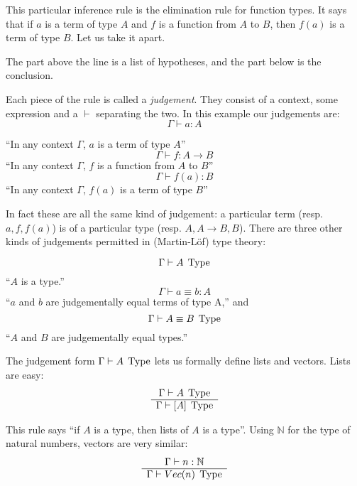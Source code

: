 This particular inference rule is the elimination rule for function types. It
says that if $a$ is a term of type $A$ and $f$ is a function from $A$ to $B$,
then $f(a)$ is a term of type $B$. Let us take it apart.

The part above the line is a list of hypotheses, and the part below is the conclusion.

Each piece of the rule is called a \emph{judgement}. They consist of a
context, some expression and a $\vdash$ separating the two. In this example our judgements are:
\[\Gamma \vdash a : A\]
\begin{center}
``In any context $\Gamma$, $a$ is a term of type $A$''
\[\Gamma \vdash f : A \rightarrow B\]
``In any context $\Gamma$, $f$ is a function from $A$ to $B$''
\[\Gamma \vdash f(a) : B\]
``In any context $\Gamma$, $f(a)$ is a term of type $B$''
\end{center}

In fact these are all the same kind of judgement: a particular term (resp. $a, f,
f(a)$) is of a particular type (resp. $A, A \rightarrow B, B$). There are three
other kinds of judgements permitted in (Martin-Löf) type theory:
\begin{center}
  \[\Gamma \vdash A \; \operatorname{Type}\]
  ``$A$ is a type.''
  \[\Gamma \vdash a \equiv b : A\]
  ``$a$ and $b$ are judgementally equal terms of type A,'' and
  \[\Gamma \vdash A \equiv B \; \operatorname{Type}\]
  ``$A$ and $B$ are judgementally equal types.''
\end{center}

The judgement form $\Gamma \vdash A \; \operatorname{Type}$ lets us formally define lists and
vectors. Lists are easy:
\begin{equation*}
  \begin{array}{c}
    \Gamma \vdash A \; \operatorname{Type} \\
    \hline
    \Gamma \vdash [A] \; \operatorname{Type}
  \end{array}
  \label{rule:lists}
\end{equation*}

This rule says ``if $A$ is a type, then lists of $A$ is a type''. Using
$\mathbb{N}$ for the type of natural numbers, vectors are very similar:
\begin{equation*}
  \begin{array}{c}
    \Gamma \vdash n : \mathbb{N} \\
    \hline
    \Gamma \vdash Vec (n) \; \operatorname{Type}
  \end{array}
  \label{rule:lists}
\end{equation*}

